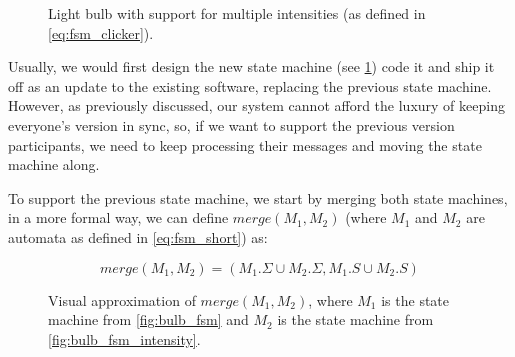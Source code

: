 \documentclass[a4paper]{article}
\begin{document}
\begin{figure}[ht]
    \centering
    \caption{Light bulb with support for multiple intensities (as defined in \cref{eq:fsm_clicker}).}
    \label{fig:bulb_fsm_multi_intensity}
\end{figure}

Usually, we would first design the new state machine (see \cref{fig:bulb_fsm_multi_intensity})
code it and ship it off as an update to the existing software, replacing the previous state machine.
However, as previously discussed, our system cannot afford the luxury of keeping everyone's version in sync,
so, if we want to support the previous version participants,
we need to keep processing their messages and moving the state machine along.

To support the previous state machine, we start by merging both state machines,
in a more formal way, we can define $merge(M_1, M_2)$
(where $M_1$ and $M_2$ are automata as defined in \cref{eq:fsm_short}) as:

\begin{equation}
    merge(M_1, M_2) = (M_1.\Sigma \cup M_2.\Sigma, M_1.S \cup M_2.S)
    \label{eq:fsm_merge}
\end{equation}

\begin{figure}[ht]
    \centering
    \caption{
        Visual approximation of $merge(M_1, M_2)$,
        where $M_1$ is the state machine from \cref{fig:bulb_fsm} and
        $M_2$ is the state machine from \cref{fig:bulb_fsm_intensity}.}
    \label{fig:bulb_fsm_merge}
\end{figure}
\end{document}
